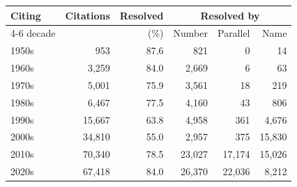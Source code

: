 \begin{tabular}{lrrrrr}
\toprule
Citing & Citations & Resolved & \multicolumn{3}{c}{Resolved by} \\
\cmidrule(lr){4-6}
decade & & (\%) & Number & Parallel & Name \\
\midrule
1950s & 953 & 87.6 & 821 & 0 & 14 \\
1960s & 3{,}259 & 84.0 & 2{,}669 & 6 & 63 \\
1970s & 5{,}001 & 75.9 & 3{,}561 & 18 & 219 \\
1980s & 6{,}467 & 77.5 & 4{,}160 & 43 & 806 \\
1990s & 15{,}667 & 63.8 & 4{,}958 & 361 & 4{,}676 \\
2000s & 34{,}810 & 55.0 & 2{,}957 & 375 & 15{,}830 \\
2010s & 70{,}340 & 78.5 & 23{,}027 & 17{,}174 & 15{,}026 \\
2020s & 67{,}418 & 84.0 & 26{,}370 & 22{,}036 & 8{,}212 \\
\bottomrule
\end{tabular}
